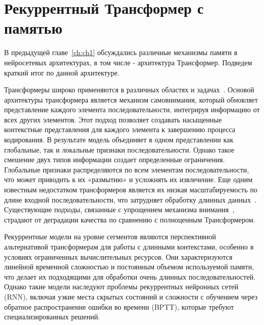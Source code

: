 \chapter{Рекуррентный Трансформер с памятью}\label{ch:ch2}

В предыдущей главе~\ref{ch:ch1} обсуждались различные механизмы памяти в нейросетевых архитектурах, в том числе - архитектура Трансформер. Подведем краткий итог по данной архитектуре. 

Трансформеры широко применяются в различных областях и задачах~\cite{RadfordNarasimhanEtAl_2018_Improving_language_understanding_by_generative_pre-training, speech-transformer, devlin2019bert, dosovitskiy2021vit, dalle, jaegle2021perceiverio}. Основой архитектуры трансформера является механизм самовнимания, который обновляет представление каждого элемента последовательности, интегрируя информацию от всех других элементов. Этот подход позволяет создавать насыщенные контекстные представления для каждого элемента к завершению процесса кодирования. В результате модель объединяет в одном представлении как глобальные, так и локальные признаки последовательности. Однако такое смешение двух типов информации создает определенные ограничения. Глобальные признаки распределяются по всем элементам последовательности, что может приводить к их «размытию» и усложнять их извлечение. Еще одним известным недостатком трансформеров является их низкая масштабируемость по длине входной последовательности, что затрудняет обработку длинных данных~\cite{child2019generating, guo2019startransformer, dai2019transformerxl, beltagy2020longformer, ainslie2020encoding, zaheer2020big, wang2020linformer, choromanski2020performer}. Существующие подходы, связанные с упрощением механизма внимания~\cite{katharopoulos2020transformers,beltagy2020longformer,zaheer2020big,ainslie2020encoding}, страдают от деградации качества по сравнению с полноценным Трансформером. 

Рекуррентные модели на уровне сегментов являются перспективной альтернативой трансформерам для работы с длинными контекстами, особенно в условиях ограниченных вычислительных ресурсов. Они характеризуются линейной временной сложностью и постоянным объемом используемой памяти, что делает их подходящими для обработки очень длинных последовательностей. Однако такие модели наследуют проблемы рекуррентных нейронных сетей (RNN), включая узкие места скрытых состояний и сложности с обучением через обратное распространение ошибки во времени (BPTT), которые требуют специализированных решений.

